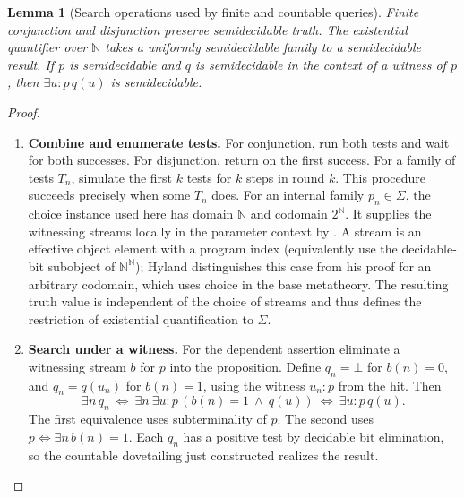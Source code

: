 \documentclass[11pt,a4paper]{article}
\newtheorem{lemma}[lemma]{Lemma}
\theoremstyle{definition}
\theoremstyle{remark}\newaliascnt{remark}{theorem}
\newcommand{\N}{\mathbb N}
\numberwithin{equation}{section}
\begin{document}
\begin{lemma}[Search operations used by finite and countable queries]\label{lem:eff-search}
Finite conjunction and disjunction preserve semidecidable truth. The existential quantifier over \(\N\) takes a uniformly semidecidable family to a semidecidable result. If \(p\) is semidecidable and \(q\) is semidecidable in the context of a witness of \(p\), then \(\exists u:p\,q(u)\) is semidecidable.
\end{lemma}
\begin{proof}\leavevmode
\begin{enumerate}[titledsteps]
    \item \textbf{Combine and enumerate tests.} For conjunction, run both tests and wait for both successes. For disjunction, return on the first success. For a family of tests $T_n$, simulate the first $k$ tests for $k$ steps in round $k$. This procedure succeeds precisely when some $T_n$ does. For an internal family $p_n\in\Sigma$, the choice instance used here has domain $\N$ and codomain $2^{\N}$. It supplies the witnessing streams locally in the parameter context by \cite[Proposition 9.1 and its following remark]{hyland}. A stream is an effective object element with a program index (equivalently use the decidable-bit subobject of $\N^{\N}$); Hyland distinguishes this case from his proof for an arbitrary codomain, which uses choice in the base metatheory. The resulting truth value is independent of the choice of streams and thus defines the restriction of existential quantification to $\Sigma$.


    \item \textbf{Search under a witness.} For the dependent assertion eliminate a witnessing stream \(b\) for \(p\) into the proposition. Define \(q_n=\bot\) for \(b(n)=0\), and \(q_n=q(u_n)\) for \(b(n)=1\), using the witness \(u_n:p\) from the hit. Then
\[
 \exists n\,q_n
   \ \Longleftrightarrow\ \exists n\ \exists u:p\,
                 (b(n)=1\ \wedge\ q(u))
   \ \Longleftrightarrow\ \exists u:p\,q(u).
\]
The first equivalence uses subterminality of \(p\). The second uses \(p\Leftrightarrow\exists n\,b(n)=1\). Each \(q_n\) has a positive test by decidable bit elimination, so the countable dovetailing just constructed realizes the result.\qedhere
\end{enumerate}
\end{proof}
\end{document}

